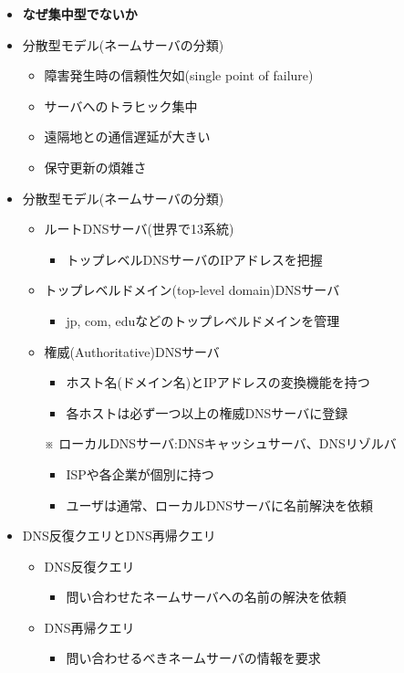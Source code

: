 \begin{itemize}
  \item \textbf{なぜ集中型でないか}
  \item 分散型モデル(ネームサーバの分類)
  \begin{itemize}
    \item 障害発生時の信頼性欠如(single point of failure)
    \item サーバへのトラヒック集中
    \item 遠隔地との通信遅延が大きい
    \item 保守更新の煩雑さ
  \end{itemize}
  \item 分散型モデル(ネームサーバの分類)
  \begin{itemize}
    \item ルートDNSサーバ(世界で13系統)
    \begin{itemize}
      \item トップレベルDNSサーバのIPアドレスを把握
    \end{itemize}
    \item トップレベルドメイン(top-level domain)DNSサーバ
    \begin{itemize}
      \item jp, com, eduなどのトップレベルドメインを管理
    \end{itemize}
    \item 権威(Authoritative)DNSサーバ
    \begin{itemize}
      \item ホスト名(ドメイン名)とIPアドレスの変換機能を持つ
      \item 各ホストは必ず一つ以上の権威DNSサーバに登録
    \end{itemize}
    \item[※] ローカルDNSサーバ:DNSキャッシュサーバ、DNSリゾルバ
    \begin{itemize}
      \item ISPや各企業が個別に持つ
      \item ユーザは通常、ローカルDNSサーバに名前解決を依頼
    \end{itemize}
  \end{itemize}
  \item DNS反復クエリとDNS再帰クエリ
  \begin{itemize}
    \item DNS反復クエリ
    \begin{itemize}
      \item 問い合わせたネームサーバへの名前の解決を依頼
    \end{itemize}
    \item DNS再帰クエリ
    \begin{itemize}
      \item 問い合わせるべきネームサーバの情報を要求
    \end{itemize}
  \end{itemize}
\end{itemize}

